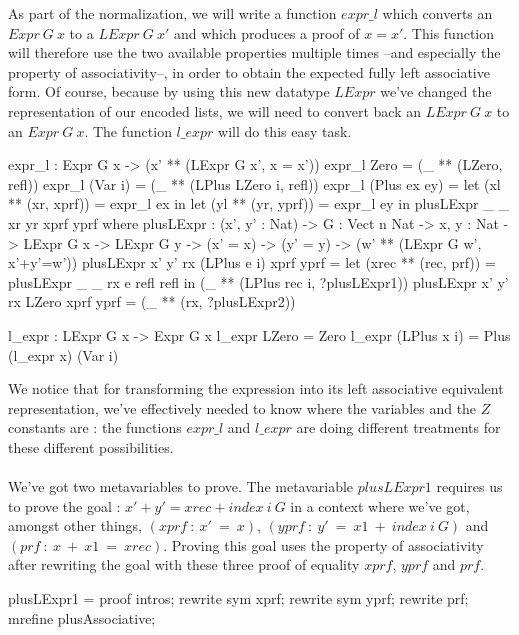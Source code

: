 \documentclass{sigplanconf}
\begin{document}
As part of the normalization, we will write a function $expr\_l$ which converts an $Expr\ G\ x$ to a $LExpr\ G\ x'$ and which produces a proof of $x=x'$. This function will therefore use the two available properties multiple times --and especially the property of associativity--, in order to obtain the expected fully left associative form. Of course, because by using this new datatype $LExpr$ we've changed the representation of our encoded lists, we will need to convert back an $LExpr\ G\ x$ to an $Expr\ G\ x$. The function $l\_expr$ will do this easy task.

\begin{code}[caption=Production of the left associative form, captionpos=b, label=lst1:haskell2]
expr_l : Expr G x 
         -> (x' ** (LExpr G x', x = x'))
expr_l Zero = (_ ** (LZero, refl))
expr_l (Var i) = (_ ** (LPlus LZero i, refl))
expr_l (Plus ex ey) = 
  let (xl ** (xr, xprf)) = expr_l ex in
  let (yl ** (yr, yprf)) = expr_l ey in
    plusLExpr _ _ xr yr xprf yprf
      where 
      plusLExpr : (x', y' : Nat)
            -> {G : Vect n Nat} -> {x, y : Nat} 
            -> LExpr G x -> LExpr G y 
            -> (x' = x) -> (y' = y) 
            -> (w' ** (LExpr G w', x'+y'=w'))
      plusLExpr x' y' rx (LPlus e i) xprf yprf =
        let (xrec ** (rec, prf)) = 
          plusLExpr _ _ rx e refl refl in
          (_ ** (LPlus rec i, ?plusLExpr1))
      plusLExpr x' y' rx LZero xprf yprf =
        (_ ** (rx, ?plusLExpr2))

l_expr : LExpr G x -> Expr G x
l_expr LZero = Zero
l_expr (LPlus x i) = Plus (l_expr x) (Var i)
\end{code}

We notice that for transforming the expression into its left associative equivalent representation, we've effectively needed to know where the variables and the $Z$ constants are : the functions $expr\_l$ and $l\_expr$ are doing different treatments for these different possibilities. \\
\\
We've got two metavariables to prove. The metavariable $plusLExpr1$ requires us to prove the goal : $x' + y' = xrec + index\ i\ G$ in a context where we've got, amongst other things,  $(xprf\ :\ x'\ =\ x)$, $(yprf\ :\ y'\ =\ x1\ +\ index\ i\ G)$ and $(prf\ :\ x\ +\ x1\ =\ xrec)$.
Proving this goal uses the property of associativity after rewriting the goal with these three proof of equality $xprf$, $yprf$ and $prf$.

\begin{code}[caption=Proof of the metavariable plusLExpr1, captionpos=b, label=lst1:haskell2]
plusLExpr1 = proof {
  intros;
  rewrite sym xprf;
  rewrite sym yprf;
  rewrite prf;
  mrefine plusAssociative;
}
\end{code}
\end{document}
